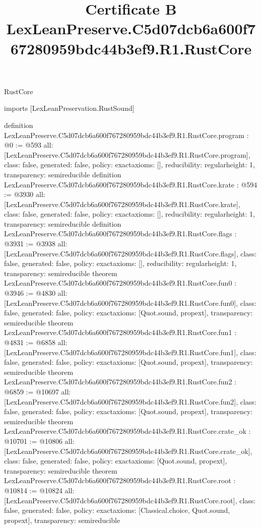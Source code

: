 \begin{lexlean}{RustCore}
\title{Certificate B LexLeanPreserve.C5d07dcb6a600f767280959bdc44b3ef9.R1.RustCore}
\begin{coremodule}
imports [LexLeanPreservation.RustSound]

definition LexLeanPreserve.C5d07dcb6a600f767280959bdc44b3ef9.R1.RustCore.program : @0 := @593 {
  all: [LexLeanPreserve.C5d07dcb6a600f767280959bdc44b3ef9.R1.RustCore.program],
  class: false,
  generated: false,
  policy: exact{axioms: []},
  reducibility: regular{height: 1},
  transparency: semireducible
}
definition LexLeanPreserve.C5d07dcb6a600f767280959bdc44b3ef9.R1.RustCore.krate : @594 := @3930 {
  all: [LexLeanPreserve.C5d07dcb6a600f767280959bdc44b3ef9.R1.RustCore.krate],
  class: false,
  generated: false,
  policy: exact{axioms: []},
  reducibility: regular{height: 1},
  transparency: semireducible
}
definition LexLeanPreserve.C5d07dcb6a600f767280959bdc44b3ef9.R1.RustCore.flags : @3931 := @3938 {
  all: [LexLeanPreserve.C5d07dcb6a600f767280959bdc44b3ef9.R1.RustCore.flags],
  class: false,
  generated: false,
  policy: exact{axioms: []},
  reducibility: regular{height: 1},
  transparency: semireducible
}
theorem LexLeanPreserve.C5d07dcb6a600f767280959bdc44b3ef9.R1.RustCore.fun0 : @3946 := @4830 {
  all: [LexLeanPreserve.C5d07dcb6a600f767280959bdc44b3ef9.R1.RustCore.fun0],
  class: false,
  generated: false,
  policy: exact{axioms: [Quot.sound, propext]},
  transparency: semireducible
}
theorem LexLeanPreserve.C5d07dcb6a600f767280959bdc44b3ef9.R1.RustCore.fun1 : @4831 := @6858 {
  all: [LexLeanPreserve.C5d07dcb6a600f767280959bdc44b3ef9.R1.RustCore.fun1],
  class: false,
  generated: false,
  policy: exact{axioms: [Quot.sound, propext]},
  transparency: semireducible
}
theorem LexLeanPreserve.C5d07dcb6a600f767280959bdc44b3ef9.R1.RustCore.fun2 : @6859 := @10697 {
  all: [LexLeanPreserve.C5d07dcb6a600f767280959bdc44b3ef9.R1.RustCore.fun2],
  class: false,
  generated: false,
  policy: exact{axioms: [Quot.sound, propext]},
  transparency: semireducible
}
theorem LexLeanPreserve.C5d07dcb6a600f767280959bdc44b3ef9.R1.RustCore.crate_ok : @10701 := @10806 {
  all: [LexLeanPreserve.C5d07dcb6a600f767280959bdc44b3ef9.R1.RustCore.crate_ok],
  class: false,
  generated: false,
  policy: exact{axioms: [Quot.sound, propext]},
  transparency: semireducible
}
theorem LexLeanPreserve.C5d07dcb6a600f767280959bdc44b3ef9.R1.RustCore.root : @10814 := @10824 {
  all: [LexLeanPreserve.C5d07dcb6a600f767280959bdc44b3ef9.R1.RustCore.root],
  class: false,
  generated: false,
  policy: exact{axioms: [Classical.choice, Quot.sound, propext]},
  transparency: semireducible
}


\end{coremodule}
\end{lexlean}
